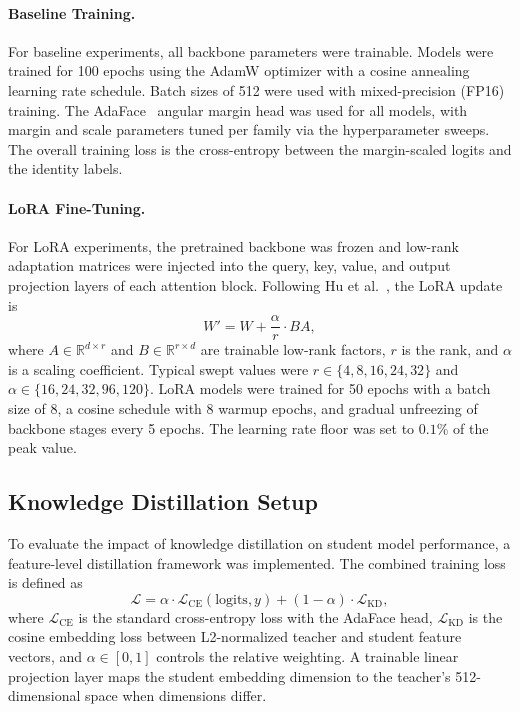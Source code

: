 \documentclass[runningheads,a4paper]{llncs}
\begin{document}
\paragraph{Baseline Training.}
For baseline experiments, all backbone parameters were trainable. Models were trained for 100 epochs using the AdamW optimizer with a cosine annealing learning rate schedule. Batch sizes of 512 were used with mixed-precision (FP16) training. The AdaFace~\cite{narayan2025petalface} angular margin head was used for all models, with margin and scale parameters tuned per family via the hyperparameter sweeps. The overall training loss is the cross-entropy between the margin-scaled logits and the identity labels.

\paragraph{LoRA Fine-Tuning.}
For LoRA experiments, the pretrained backbone was frozen and low-rank adaptation matrices were injected into the query, key, value, and output projection layers of each attention block. Following Hu et al.~\cite{hu2022lora}, the LoRA update is
\[
W' = W + \frac{\alpha}{r} \cdot BA,
\]
where $A \in \mathbb{R}^{d \times r}$ and $B \in \mathbb{R}^{r \times d}$ are trainable low-rank factors, $r$ is the rank, and $\alpha$ is a scaling coefficient. Typical swept values were $r \in \{4, 8, 16, 24, 32\}$ and $\alpha \in \{16, 24, 32, 96, 120\}$. LoRA models were trained for 50 epochs with a batch size of 8, a cosine schedule with 8 warmup epochs, and gradual unfreezing of backbone stages every 5 epochs. The learning rate floor was set to $0.1\%$ of the peak value.

\subsection{Knowledge Distillation Setup}\label{sec:kd-setup}
To evaluate the impact of knowledge distillation on student model performance, a feature-level distillation framework was implemented. The combined training loss is defined as
\begin{equation}\label{eq:kd-loss}
    \mathcal{L} = \alpha \cdot \mathcal{L}_{\text{CE}}(\text{logits}, y) + (1 - \alpha) \cdot \mathcal{L}_{\text{KD}},
\end{equation}
where $\mathcal{L}_{\text{CE}}$ is the standard cross-entropy loss with the AdaFace head, $\mathcal{L}_{\text{KD}}$ is the cosine embedding loss between L2-normalized teacher and student feature vectors, and $\alpha \in [0, 1]$ controls the relative weighting. A trainable linear projection layer maps the student embedding dimension to the teacher's 512-dimensional space when dimensions differ.
\end{document}

